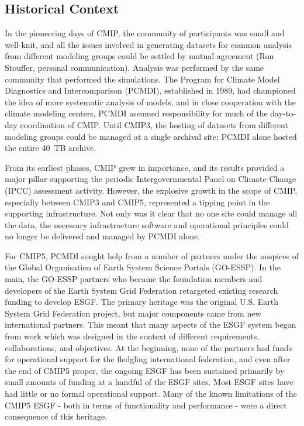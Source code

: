 \documentclass[gmd,manuscript]{copernicus}
\begin{document}
\subsection{Historical Context}
\label{sec:history}

In the pioneering days of CMIP, the community of participants was
small and well-knit, and all the issues involved in generating
datasets for common analysis from different modeling groups could be
settled by mutual agreement (Ron Stouffer, personal communication).
Analysis was performed by the same community that performed the
simulations. The Program for Climate Model Diagnostics and
Intercomparison (PCMDI), established in 1989, had championed the idea
of more systematic analysis of models, and in close cooperation with
the climate modeling centers, PCMDI assumed responsibility for much of
the day-to-day coordination of CMIP. Until CMIP3, the hosting of
datasets from different modeling groups could be managed at a single
archival site; PCMDI alone hosted the entire 40~TB archive.

From its earliest phases, CMIP grew in importance, and its results
provided a major pillar supporting the periodic Intergovernmental
Panel on Climate Change (IPCC) assessment activity. However, the
explosive growth in the scope of CMIP, especially between CMIP3 and
CMIP5, represented a tipping point in the supporting infrastructure.
Not only was it clear that no one site could manage all the data, the
necessary infrastructure software and operational principles could no
longer be delivered and managed by PCMDI alone.

For CMIP5, PCMDI sought help from a number of partners under the
auspices of the Global Organisation of Earth System Science Portals
(GO-ESSP). In the main, the GO-ESSP partners who became the foundation
members and developers of the Earth System Grid Federation retargeted
existing research funding to develop ESGF. The primary heritage was
the original U.S. Earth System Grid Federation project, but major
components came from new international partners. This meant that many
aspects of the ESGF system began from work which was designed in the
context of different requirements, collaborations, and objectives. At
the beginning, none of the partners had funds for operational support
for the fledgling international federation, and even after the end of
CMIP5 proper, the ongoing ESGF has been sustained primarily by small
amounts of funding at a handful of the ESGF sites. Most ESGF sites
have had little or no formal operational support. Many of the known
limitations of the CMIP5 ESGF - both in terms of functionality and
performance - were a direct consequence of this heritage.
\end{document}
